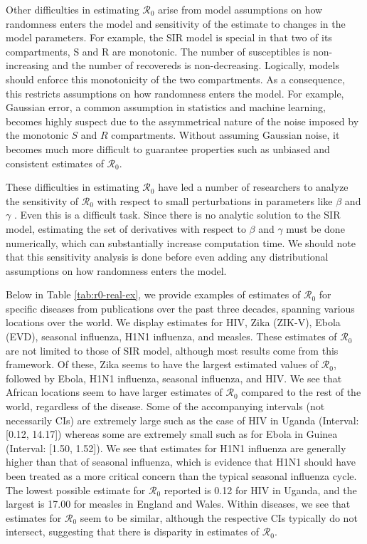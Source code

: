\documentclass[12pt]{article}
\newcommand{\rr}{\ensuremath{\mathcal{R}_0}}
\begin{document}
Other difficulties in estimating $\rr$ arise from model assumptions on how randomness enters the model and sensitivity of the estimate to changes in the model parameters.  For example, the SIR model is special in that two of its compartments, S and R are monotonic.  The number of susceptibles is non-increasing and the number of recovereds is non-decreasing.  Logically, models should enforce this monotonicity of the two compartments.  As a consequence, this restricts assumptions on how randomness enters the model.  For example, Gaussian error, a common assumption in statistics and machine learning, becomes highly suspect due to the assymmetrical nature of the noise imposed by the monotonic $S$ and $R$ compartments.  Without assuming Gaussian noise, it becomes much more difficult to guarantee properties such as unbiased and consistent estimates of $\rr$.

These difficulties in estimating $\rr$ have led a number of researchers to analyze the sensitivity of $\rr$ with respect to small perturbations in parameters like $\beta$ and $\gamma$ \citep{lash2003,epstein2007agent,capaldi2012}.  Even this is a difficult task. Since there is no analytic solution to the SIR model, estimating the set of derivatives with respect to $\beta$ and $\gamma$ must be done numerically, which can substantially increase computation time.  We should note that this sensitivity analysis is done before even adding any distributional assumptions on how randomness enters the model.

Below in Table \ref{tab:r0-real-ex}, we provide examples of estimates of $\rr$ for specific diseases from publications over the past three decades, spanning various locations over the world.  We display estimates for HIV, Zika (ZIK-V), Ebola (EVD), seasonal influenza, H1N1 influenza, and measles.  These estimates of $\rr$ are not limited to those of SIR model, although most results come from this framework.  Of these, Zika seems to have the largest estimated values of $\rr$, followed by Ebola, H1N1 influenza, seasonal influenza, and HIV.  We see that African locations seem to have larger estimates of $\rr$ compared to the rest of the world, regardless of the disease.  Some of the accompanying intervals (not necessarily CIs) are extremely large such as the case of HIV in Uganda (Interval: [0.12, 14.17]) whereas some are extremely small such as for Ebola in Guinea (Interval: [1.50, 1.52]).  We see that estimates for H1N1 influenza are generally higher than that of seasonal influenza, which is evidence that H1N1 should have been treated as a more critical concern than the typical seasonal influenza cycle.  The lowest possible estimate for $\rr$ reported is 0.12 for HIV in Uganda, and the largest is 17.00 for measles in England and Wales.  Within diseases, we see that estimates for $\rr$ seem to be similar, although the respective CIs typically do not intersect, suggesting that there is disparity in estimates of $\rr$.
\end{document}
